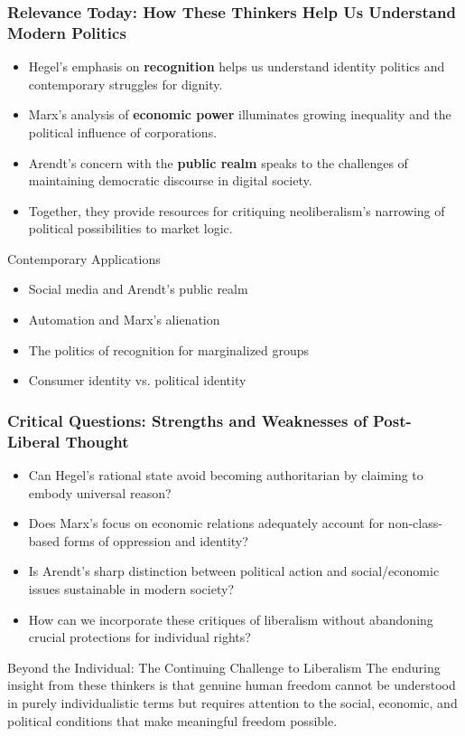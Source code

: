 \documentclass{beamer}
\begin{document}
\begin{frame}
\frametitle{Relevance Today: How These Thinkers Help Us Understand Modern Politics}
\begin{itemize}
    \item Hegel's emphasis on \textbf{recognition} helps us understand identity politics and contemporary struggles for dignity.
    \item Marx's analysis of \textbf{economic power} illuminates growing inequality and the political influence of corporations.
    \item Arendt's concern with the \textbf{public realm} speaks to the challenges of maintaining democratic discourse in digital society.
    \item Together, they provide resources for critiquing neoliberalism's narrowing of political possibilities to market logic.
\end{itemize}

\begin{exampleblock}{Contemporary Applications}
\begin{itemize}
    \item Social media and Arendt's public realm
    \item Automation and Marx's alienation
    \item The politics of recognition for marginalized groups
    \item Consumer identity vs. political identity
\end{itemize}
\end{exampleblock}
\end{frame}

\begin{frame}
\frametitle{Critical Questions: Strengths and Weaknesses of Post-Liberal Thought}
\begin{itemize}
    \item Can Hegel's rational state avoid becoming authoritarian by claiming to embody universal reason?
    \item Does Marx's focus on economic relations adequately account for non-class-based forms of oppression and identity?
    \item Is Arendt's sharp distinction between political action and social/economic issues sustainable in modern society?
    \item How can we incorporate these critiques of liberalism without abandoning crucial protections for individual rights?
\end{itemize}

\begin{alertblock}{Beyond the Individual: The Continuing Challenge to Liberalism}
The enduring insight from these thinkers is that genuine human freedom cannot be understood in purely individualistic terms but requires attention to the social, economic, and political conditions that make meaningful freedom possible.
\end{alertblock}
\end{frame}
\end{document}
